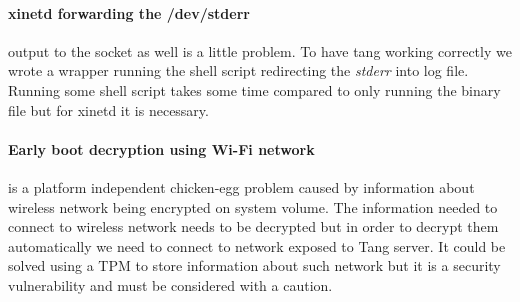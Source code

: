 \paragraph{xinetd forwarding the /dev/stderr} output to the socket as well is a little problem.
To have tang working correctly we wrote a wrapper running the shell script redirecting the {\it stderr} into log file.
Running some shell script takes some time compared to only running the binary file but for xinetd it is necessary.

\paragraph{Early boot decryption using Wi-Fi network} is a platform independent chicken-egg problem caused by information about wireless network being encrypted on system volume.
The information needed to connect to wireless network needs to be decrypted but in order to decrypt them automatically we need to connect to network exposed to Tang server.
It could be solved using a TPM to store information about such network but it is a security vulnerability and must be considered with a caution.
